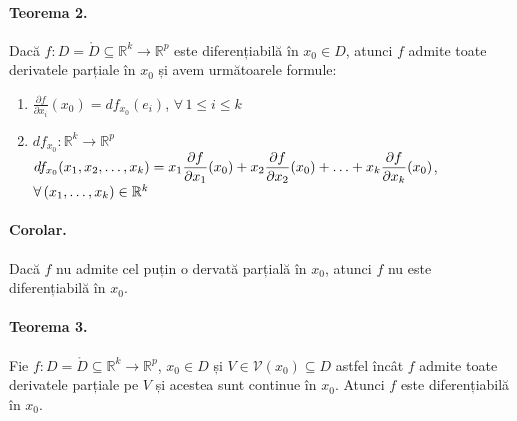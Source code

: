 \paragraph{Teorema 2.}
Dacă $f:D=\mathring{D} \subseteq \mathbb{R}^{k} \rightarrow \mathbb{R}^{p}$ este diferențiabilă în $x_{0} \in D$,
atunci $f$ admite toate derivatele parțiale în $x_{0}$ și avem următoarele formule:
\begin{enumerate}[label=\emph{\alph*})]
    \item $\displaystyle\frac{\partial f}{\partial x_{i}}(x_{0}) = df_{x_{0}}(e_{i})$, $\forall \, 1 \leq i \leq k$
    \item $df_{x_{0}}: \mathbb{R}^{k} \rightarrow \mathbb{R}^{p}$ \\
        $df_{x_{0}}(x_{1}, x_{2}, \mathellipsis, x_{k}) = x_{1} \displaystyle\frac{\partial f}{\partial x_{1}}(x_{0}) +
        x_{2} \displaystyle\frac{\partial f}{\partial x_{2}}(x_{0}) + \mathellipsis + x_{k} \displaystyle\frac{\partial f}{\partial x_{k}}(x_{0})$, 
        $\forall \, (x_{1}, \mathellipsis, x_{k}) \in \mathbb{R}^{k}$
\end{enumerate}

\paragraph{Corolar.}
Dacă $f$ nu admite cel puțin o dervată parțială în $x_{0}$, atunci $f$ nu este diferențiabilă în $x_{0}$.

\paragraph{Teorema 3.}
Fie $f:D = \mathring{D} \subseteq \mathbb{R}^{k} \rightarrow \mathbb{R}^{p}$, $x_{0} \in D$ și $V \in \mathcal{V}(x_{0}) \subseteq D$
astfel încât $f$ admite toate derivatele parțiale pe $V$ și acestea sunt continue în $x_{0}$. Atunci $f$ este diferențiabilă în $x_{0}$.

